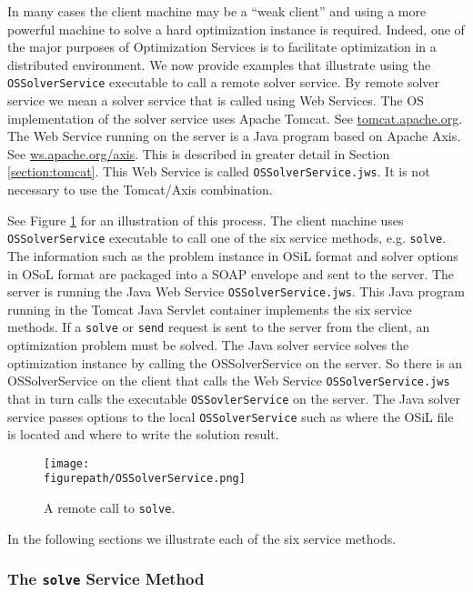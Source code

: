 \documentclass[11pt]{article}
\newcommand{\figurepath}{./figures}
\newcounter{Fig}
\renewcommand{\_}{{\char"5F}}
\renewcommand{\{}{{\char"7B}}
\renewcommand{\}}{{\char"7D}}
\renewcommand{\^}{{\char"0D}}
\renewcommand{\'}{{\char"0D}}
\begin{document}
In many cases the client machine may be a ``weak client'' and  using a more powerful machine to solve a hard optimization instance is required. Indeed, one of the major purposes of Optimization Services is to facilitate optimization in a distributed environment.   We now provide examples that illustrate using the {\tt OSSolverService} executable to call a remote solver service.   By remote solver service we mean a solver service that is called using Web Services.  The OS implementation  of the solver service  uses Apache Tomcat. See \url{tomcat.apache.org}. The Web Service running on the server is a Java program based on Apache Axis. See \url{ws.apache.org/axis}. This is described in greater detail in Section \ref{section:tomcat}.  This Web Service is called {\tt OSSolverService.jws}. It is not necessary to use the Tomcat/Axis combination.



See Figure \ref{figure:ossolverservice} for an illustration of this process. The client machine uses {\tt OSSolverService} executable to call one of the six service methods, e.g. {\tt solve}. The  information such as the problem instance in OSiL format and solver options in OSoL format are packaged into a SOAP envelope and sent to the server. The server is running the Java Web Service {\tt OSSolverService.jws}. This Java program running in the Tomcat Java Servlet container implements the six service methods. If a {\tt solve} or {\tt send} request is sent to the server from the client, an optimization problem must be solved. The Java solver service solves the optimization instance by  calling the  OSSolverService on the server. So there is an OSSolverService on the client that calls the Web Service {\tt  OSSolverService.jws} that in turn calls  the executable {\tt OSSovlerService} on the server. The Java solver service passes options to the local {\tt OSSolverService} such as where the OSiL file is located and where to write the solution result.

\begin{figure}
\centering
\texttt{[image: \\figurepath/OSSolverService.png]}
\caption{A remote call to {\tt solve}.} 
\label{figure:ossolverservice}
\end{figure}


In the following sections we illustrate each of the six service methods.

\subsubsection{The  {\tt solve} Service Method}\label{section:solve}
\end{document}
